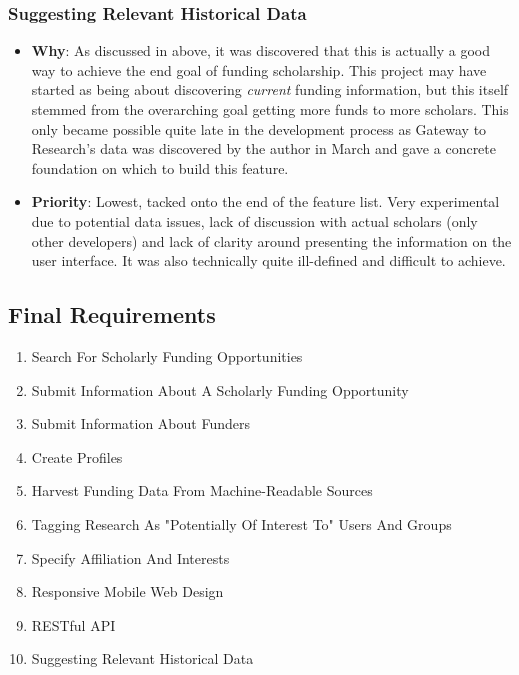 \subsubsection{Suggesting Relevant Historical Data}
\begin{itemize}
 \item \textbf{Why}: As discussed in  above, it was discovered that this is actually a good way to achieve the end goal of funding scholarship. This project may have started as being about discovering \emph{current} funding information, but this itself stemmed from the overarching goal getting more funds to more scholars. This only became possible quite late in the development process as Gateway to Research's data was discovered by the author in March and gave a concrete foundation on which to build this feature.
 \item \textbf{Priority}: Lowest, tacked onto the end of the feature list. Very experimental due to potential data issues, lack of discussion with actual scholars (only other developers) and lack of clarity around presenting the information on the user interface. It was also technically quite ill-defined and difficult to achieve.
\end{itemize}

\subsection{Final Requirements}
\label{final-reqs}


\begin{enumerate}
\item Search For Scholarly Funding Opportunities
\item Submit Information About A Scholarly Funding Opportunity
\item Submit Information About Funders
\item Create Profiles
\item Harvest Funding Data From Machine-Readable Sources
\item Tagging Research As "Potentially Of Interest To" Users And Groups
\item Specify Affiliation And Interests
\item Responsive Mobile Web Design
\item RESTful API
\item Suggesting Relevant Historical Data
\end{enumerate}


